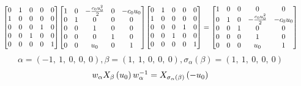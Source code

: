 \documentclass[11pt]{article}
\theoremstyle{definition}
\begin{document}
\[
\scaletoalign{\textwidth}{{\left[\begin{matrix}0 & 1 & 0 & 0 & 0\\1 & 0 & 0 & 0 & 0\\0 & 0 & 0 & 1 & 0\\0 & 0 & 1 & 0 & 0\\0 & 0 & 0 & 0 & 1\end{matrix}\right]} {\left[\begin{matrix}1 & 0 & - \frac{c_{0} u_{0}^{2}}{2} & 0 & - c_{0} u_{0}\\0 & 1 & 0 & 0 & 0\\0 & 0 & 1 & 0 & 0\\0 & 0 & 0 & 1 & 0\\0 & 0 & u_{0} & 0 & 1\end{matrix}\right]} {\left[\begin{matrix}0 & 1 & 0 & 0 & 0\\1 & 0 & 0 & 0 & 0\\0 & 0 & 0 & 1 & 0\\0 & 0 & 1 & 0 & 0\\0 & 0 & 0 & 0 & 1\end{matrix}\right]} = {\left[\begin{matrix}1 & 0 & 0 & 0 & 0\\0 & 1 & 0 & - \frac{c_{0} u_{0}^{2}}{2} & - c_{0} u_{0}\\0 & 0 & 1 & 0 & 0\\0 & 0 & 0 & 1 & 0\\0 & 0 & 0 & u_{0} & 1\end{matrix}\right]}}
\]
\[
\alpha = \left( -1, \  1, \  0, \  0, \  0\right), \beta = \left( 1, \  1, \  0, \  0, \  0\right), \sigma_{\alpha}(\beta) = \left( 1, \  1, \  0, \  0, \  0\right)
\]
\[
\scaletoalign{\textwidth}{w_{\alpha} X_{\beta}\left(u_{0}\right) w_{\alpha}^{-1} = X_{\sigma_{\alpha}\left(\beta\right)}\left(- u_{0}\right)}
\]
\end{document}
